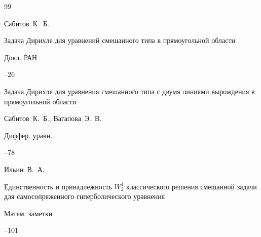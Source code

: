\begin{thebibliography}{99}











\by Сабитов~К.~Б.

\paper Задача Дирихле для уравнений смешанного типа в прямоугольной области

\jour Докл. РАН




--26










\paper Задача Дирихле для уравнения смешанного типа с двумя линиями вырождения в прямоугольной области

\by  Сабитов~К.~Б., Вагапова~Э.~В.

\jour Диффер. уравн.




--78






\by  Ильин~В.~А.

\paper Единственность и принадлежность $W^1_2$ классического решения смешанной задачи для самосопряженного гиперболического уравнения

\jour Матем. заметки




--101





\end{thebibliography}
